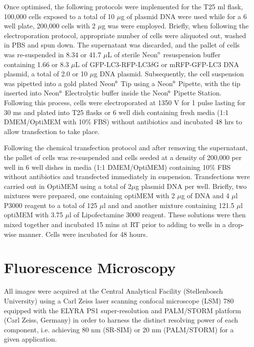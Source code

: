 Once optimised, the following protocols were implemented for the T25 ml flask, 100,000 cells exposed to a total of 10 $\mu$g of plasmid DNA were used while for a 6 well plate, 200,000 cells with 2 $\mu$g was were employed. Briefly, when following the electroporation protocol, appropriate number of cells were aliquoted out, washed in PBS and spun down. The supernatant was discarded, and the pallet of cells was re-suspended in 8.34 or 41.7 $\mu$L of sterile Neon${\textsuperscript{\tiny{\textregistered}}}$ resuspension buffer containing 1.66 or 8.3 $\mu$L of GFP-LC3-RFP-LC3$\delta$G or mRFP-GFP-LC3 DNA plasmid, a total of 2.0 or 10 $\mu$g DNA plasmid. Subsequently, the cell suspension was pipetted into a gold plated Neon${\textsuperscript{\tiny{\textregistered}}}$ Tip using a Neon${\textsuperscript{\tiny{\textregistered}}}$ Pipette, with the tip inserted into Neon${\textsuperscript{\tiny{\textregistered}}}$ Electrolytic buffer inside the Neon${\textsuperscript{\tiny{\textregistered}}}$ Pipette Station. Following this process, cells were electroporated at 1350 V for 1 pulse lasting for 30 ms and plated into T25 flasks or 6 well dish containing fresh media (1:1 DMEM/OptiMEM with 10\% FBS) without antibiotics and incubated 48 hrs to allow transfection to take place.

Following the chemical transfection protocol and after removing the supernatant, the pallet of cells was re-suspended and cells seeded at a density of 200,000 per well in 6 well dishes in media (1:1 DMEM/OptiMEM) containing 10\% FBS without antibiotics and transfected immediately in suspension. Transfections were carried out in OptiMEM using a total of 2$\mu$g plasmid DNA per well. Briefly, two mixtures were prepared, one containing optiMEM with 2 $\mu$g of DNA and 4 $\mu$l P3000 reagent to a total of 125 $\mu$l and and another mixture containing 121.5 $\mu$l optiMEM with 3.75 $\mu$l of Lipofectamine 3000 reagent.  These solutions were then mixed together and incubated 15 mins at RT prior to adding to wells in a drop-wise manner. Cells were incubated for 48 hours. 

\section{Fluorescence Microscopy}
All images were acquired at the Central Analytical Facility (Stellenbosch University) using a Carl Zeiss laser scanning confocal microscope (LSM) 780 equipped with the ELYRA PS1 super-resolution and PALM/STORM platform (Carl Zeiss, Germany) in order to harness the distinct resolving power of each component, i.e. achieving 80 nm (SR-SIM) or 20 nm (PALM/STORM) for a given application. 

 


